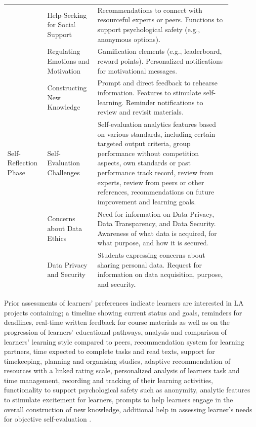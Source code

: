 \documentclass{l4proj}
\begin{document}
\begin{longtable}{p{0.15\linewidth} | p{0.2\linewidth} | p{0.55\linewidth}}
 &
  Help-Seeking for Social Support &
  Recommendations to connect with resourceful experts or peers. \newline
  Functions to support psychological safety (e.g., anonymous options). \\
 &
  Regulating Emotions and Motivation &
  Gamification elements (e.g., leaderboard, reward points). \newline
  Personalized notifications for motivational messages. \\
 &
  Constructing New Knowledge &
  Prompt and direct feedback to rehearse information.\newline
  Features to stimulate self-learning. \newline
  Reminder notifications to review and revisit materials. \newline \\
Self-Reflection Phase &
  Self-Evaluation Challenges &
  Self-evaluation analytics features based on various standards, including certain targeted output criteria, group performance without competition aspects, own standards or past performance track record, review from experts, review from peers or other references, recommendations on future improvement and learning goals. \\
 &
  Concerns about Data Ethics &
  Need for information on Data Privacy, Data Transparency, and Data Security. \newline
  Awareness of what data is acquired, for what purpose, and how it is secured. \\
 &
  Data Privacy and Security &
  Students expressing concerns about sharing personal data. \newline
  Request for information on data acquisition, purpose, and security. \\ \bottomrule
\end{longtable}


Prior assessments of learners' preferences indicate learners are interested in LA projects containing; a timeline showing current status and goals, reminders for deadlines, real-time written feedback for course materials as well as on the progression of learners' educational pathways, analysis and comparison of learners' learning style compared to peers, recommendation system for learning partners, time expected to complete tasks and read texts, support for timekeeping, planning and organising studies, adaptive recommendation of resources with a linked rating scale, personalized analysis of learners task and time management, recording and tracking of their learning activities, functionality to support psychological safety such as anonymity, analytic features to stimulate excitement for learners, prompts to help learners engage in the overall construction of new knowledge, additional help in assessing learner's needs for objective self-evaluation \citep{Schumacher2018FeaturesAnalytics}. 
\end{document}
